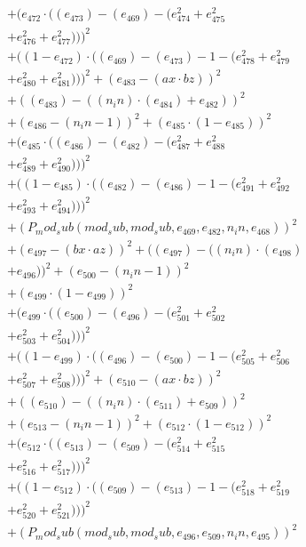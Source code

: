 \documentclass[10pt, a4paper]{article}
\begin{document}
\begin{align*}
& + (e_{472}  \cdot  ((e_{473}) - (e_{469}) - (e_{474}^{2} + e_{475}^{2} \\
& + e_{476}^{2} + e_{477}^{2})))^{2} \\
& + ((1 - e_{472})  \cdot  ((e_{469}) - (e_{473}) - 1 - (e_{478}^{2} + e_{479}^{2} \\
& + e_{480}^{2} + e_{481}^{2})))^{2} + (e_{483} - (ax  \cdot  bz))^{2} \\
& + ((e_{483}) - ((n_in)  \cdot  (e_{484}) + e_{482}))^{2} \\
& + (e_{486} - (n_in - 1))^{2} + (e_{485}  \cdot  (1 - e_{485}))^{2} \\
& + (e_{485}  \cdot  ((e_{486}) - (e_{482}) - (e_{487}^{2} + e_{488}^{2} \\
& + e_{489}^{2} + e_{490}^{2})))^{2} \\
& + ((1 - e_{485})  \cdot  ((e_{482}) - (e_{486}) - 1 - (e_{491}^{2} + e_{492}^{2} \\
& + e_{493}^{2} + e_{494}^{2})))^{2} \\
& + (P_mod_sub(mod_sub, mod_sub, e_{469}, e_{482}, n_in, e_{468}))^{2} \\
& + (e_{497} - (bx  \cdot  az))^{2} + ((e_{497}) - ((n_in)  \cdot  (e_{498}) \\
& + e_{496}))^{2} + (e_{500} - (n_in - 1))^{2} \\
& + (e_{499}  \cdot  (1 - e_{499}))^{2} \\
& + (e_{499}  \cdot  ((e_{500}) - (e_{496}) - (e_{501}^{2} + e_{502}^{2} \\
& + e_{503}^{2} + e_{504}^{2})))^{2} \\
& + ((1 - e_{499})  \cdot  ((e_{496}) - (e_{500}) - 1 - (e_{505}^{2} + e_{506}^{2} \\
& + e_{507}^{2} + e_{508}^{2})))^{2} + (e_{510} - (ax  \cdot  bz))^{2} \\
& + ((e_{510}) - ((n_in)  \cdot  (e_{511}) + e_{509}))^{2} \\
& + (e_{513} - (n_in - 1))^{2} + (e_{512}  \cdot  (1 - e_{512}))^{2} \\
& + (e_{512}  \cdot  ((e_{513}) - (e_{509}) - (e_{514}^{2} + e_{515}^{2} \\
& + e_{516}^{2} + e_{517}^{2})))^{2} \\
& + ((1 - e_{512})  \cdot  ((e_{509}) - (e_{513}) - 1 - (e_{518}^{2} + e_{519}^{2} \\
& + e_{520}^{2} + e_{521}^{2})))^{2} \\
& + (P_mod_sub(mod_sub, mod_sub, e_{496}, e_{509}, n_in, e_{495}))^{2} \\

\end{align*}
\end{document}
